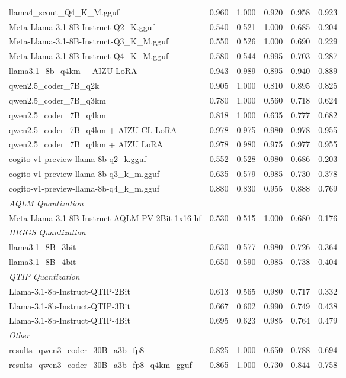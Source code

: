 \begin{table}[htbp]
{\begin{tabular}{lrrrrr}
    llama4\_scout\_Q4\_K\_M.gguf & 0.960 & 1.000 & 0.920 & 0.958 & \cellcolor{green!30}0.923 \\
    Meta-Llama-3.1-8B-Instruct-Q2\_K.gguf & 0.540 & 0.521 & 1.000 & 0.685 & 0.204 \\
    Meta-Llama-3.1-8B-Instruct-Q3\_K\_M.gguf & 0.550 & 0.526 & 1.000 & 0.690 & 0.229 \\
    Meta-Llama-3.1-8B-Instruct-Q4\_K\_M.gguf & 0.580 & 0.544 & 0.995 & 0.703 & 0.287 \\
    llama3.1\_8b\_q4km + AIZU LoRA & 0.943 & 0.989 & 0.895 & 0.940 & 0.889 \\
    qwen2.5\_coder\_7B\_q2k & 0.905 & 1.000 & 0.810 & 0.895 & 0.825 \\
    qwen2.5\_coder\_7B\_q3km & 0.780 & 1.000 & 0.560 & 0.718 & 0.624 \\
    qwen2.5\_coder\_7B\_q4km & 0.818 & 1.000 & 0.635 & 0.777 & 0.682 \\
    qwen2.5\_coder\_7B\_q4km + AIZU-CL LoRA & 0.978 & 0.975 & 0.980 & 0.978 & \cellcolor{green!50}0.955 \\
    qwen2.5\_coder\_7B\_q4km + AIZU LoRA & 0.978 & 0.980 & 0.975 & 0.977 & \cellcolor{green!40}0.955 \\
    cogito-v1-preview-llama-8b-q2\_k.gguf & 0.552 & 0.528 & 0.980 & 0.686 & 0.203 \\
    cogito-v1-preview-llama-8b-q3\_k\_m.gguf & 0.635 & 0.579 & 0.985 & 0.730 & 0.378 \\
    cogito-v1-preview-llama-8b-q4\_k\_m.gguf & 0.880 & 0.830 & 0.955 & 0.888 & 0.769 \\
    \midrule
    \multicolumn{6}{l}{\textit{AQLM Quantization}} \\
    \midrule
    Meta-Llama-3.1-8B-Instruct-AQLM-PV-2Bit-1x16-hf & 0.530 & 0.515 & 1.000 & 0.680 & 0.176 \\
    \midrule
    \multicolumn{6}{l}{\textit{HIGGS Quantization}} \\
    \midrule
    llama3.1\_8B\_3bit & 0.630 & 0.577 & 0.980 & 0.726 & 0.364 \\
    llama3.1\_8B\_4bit & 0.650 & 0.590 & 0.985 & 0.738 & 0.404 \\
    \midrule
    \multicolumn{6}{l}{\textit{QTIP Quantization}} \\
    \midrule
    Llama-3.1-8b-Instruct-QTIP-2Bit & 0.613 & 0.565 & 0.980 & 0.717 & 0.332 \\
    Llama-3.1-8b-Instruct-QTIP-3Bit & 0.667 & 0.602 & 0.990 & 0.749 & 0.438 \\
    Llama-3.1-8b-Instruct-QTIP-4Bit & 0.695 & 0.623 & 0.985 & 0.764 & 0.479 \\
    \midrule
    \multicolumn{6}{l}{\textit{Other}} \\
    \midrule
    results\_qwen3\_coder\_30B\_a3b\_fp8 & 0.825 & 1.000 & 0.650 & 0.788 & 0.694 \\
    results\_qwen3\_coder\_30B\_a3b\_fp8\_q4km\_gguf & 0.865 & 1.000 & 0.730 & 0.844 & 0.758 \\
    \bottomrule
  \end{tabular}
  }
\end{table}

